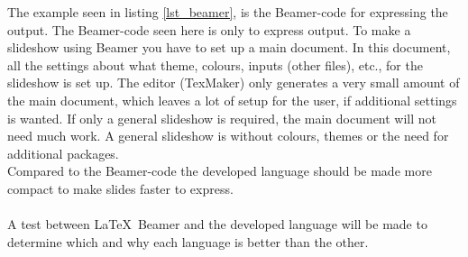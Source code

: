 The example seen in listing \ref{lst_beamer}, is the Beamer-code for expressing the output. The Beamer-code seen here is only to express output. To make a slideshow using Beamer you have to set up a main document. In this document, all the settings about what theme, colours, inputs (other files), etc., for the slideshow is set up. The editor (TexMaker) only generates a very small amount of the main document, which leaves a lot of setup for the user, if additional settings is wanted. If only a general slideshow is required, the main document will not need much work. A general slideshow is without colours, themes or the need for additional packages.\\


Compared to the Beamer-code the developed language should be made more compact to make slides faster to express.
\\ \\
A test between \LaTeX~Beamer and the developed language will be made to determine which and why each language is better than the other.